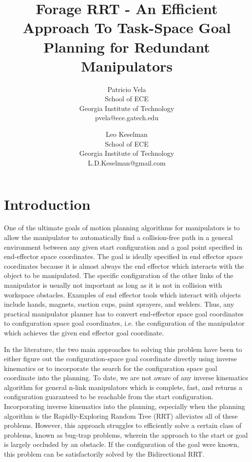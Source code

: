 \documentclass[conference]{IEEEtran}
\begin{document}
\title{Forage RRT - An Efficient Approach To Task-Space Goal Planning for Redundant Manipulators}
\author{Patricio Vela\\ 
	School of ECE\\
	Georgia Institute of Technology\\
	 pvela@ece.gatech.edu \and
	Leo Keselman\\
	School of ECE\\
	 Georgia Institute of Technology\\
	 L.D.Keselman@gmail.com}
\maketitle
\section{Introduction}
One of the ultimate goals of motion planning algorithms for manipulators is to allow the manipulator to automatically find a collision-free
path in a general environment between any given start configuration and a goal point specified in end-effector space coordinates. The goal
is ideally specified in end effector space coordinates because it is almost always the end effector which interacts with the object to be
manipulated. The specific configuration of the other links of the manipulator is usually not important as long as it is not in collision
with workspace obstacles. Examples of end effector tools which interact with objects include hands, magnets, suction cups, paint sprayers,
and welders. Thus, any practical manipulator planner has to convert end-effector space goal coordinates to configuration space goal
coordinates, i.e. the configuration of the manipulator which achieves the given end effector goal coordinate.

In the literature, the two main approaches to solving this problem have been to either figure out the configuration-space goal coordinate
directly using inverse kinematics or to incorporate the search for the configuration space goal coordinate into the planning. To date, we
are not aware of any inverse kinematics algorithm for general n-link manipulators which is complete, fast, and returns a configuration
guaranteed to be reachable from the start configuration. Incorporating inverse kinematics into the planning, especially when the planning
algorithm is the Rapidly-Exploring Random Tree (RRT) alleviates all of these problems. However, this approach struggles to efficiently solve
a certain class of problems, known as bug-trap problems, wherein the approach to the start or goal is largely occluded by an obstacle. If
the configuration of the goal were known, this problem can be satisfactorily solved by the Bidirectional RRT. 
\end{document}

